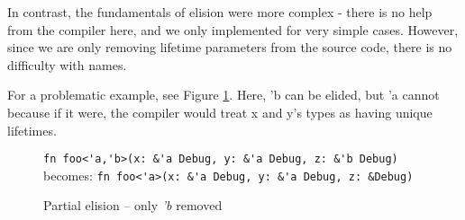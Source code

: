 In contrast, the fundamentals of elision were more complex - there is no help from the compiler here, and we only implemented for very simple cases. However, since we are only removing lifetime parameters from the source code, there is no difficulty with names.

For a problematic example, see Figure \ref{Fig:partial}. Here, 'b can be elided, but 'a cannot because if it were, the compiler would treat x and y's types as having unique lifetimes.

\begin{figure}[h]
{\verb|fn foo<'a,'b>(x: &'a Debug, y: &'a Debug, z: &'b Debug)|}\newline
becomes:\newline
{\verb|fn foo<'a>(x: &'a Debug, y: &'a Debug, z: &Debug)|}
\caption{Partial elision -- only \emph{'b} removed}
\label{Fig:partial}
\end{figure}

